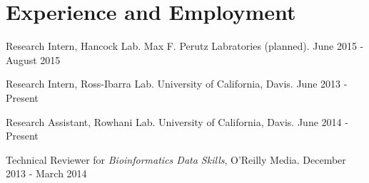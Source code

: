 \documentclass[letterpaper]{article}
\renewenvironment{itemize}{
  \begin{list}{}{
    \setlength{\leftmargin}{1em}
  }
}{
  \end{list}
}
\begin{document}
\section*{Experience and Employment}
\begin{itemize}
\item Research Intern, Hancock Lab. Max F. Perutz Labratories (planned). \hfill June 2015 - August 2015
\item Research Intern, Ross-Ibarra Lab. University of California, Davis. \hfill June 2013 - Present
\item Research Assistant, Rowhani Lab. University of California, Davis. \hfill June 2014 - Present
\item Technical Reviewer for \textit{Bioinformatics Data Skills}, O'Reilly Media. \hfill December 2013 - March 2014

\end{itemize}
\end{document}
